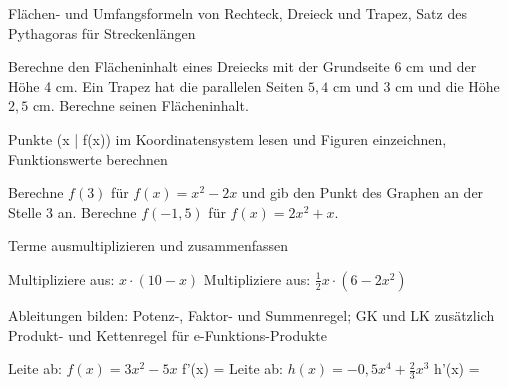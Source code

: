 \setcounter{aufgabe}{0}

\begin{aufgabe}{Flächen- und Umfangsformeln von Rechteck, Dreieck und Trapez, Satz des Pythagoras für Streckenlängen}
\begin{teile}
\teil Berechne den Flächeninhalt eines Dreiecks mit der Grundseite 6 cm und der Höhe 4 cm. \leerfeld[cm²]
\teil Ein Trapez hat die parallelen Seiten $5{,}4$ cm und 3 cm und die Höhe $2{,}5$ cm. Berechne seinen Flächeninhalt. \leerfeld[cm²]
\end{teile}
\end{aufgabe}

\begin{aufgabe}{Punkte (x | f(x)) im Koordinatensystem lesen und Figuren einzeichnen, Funktionswerte berechnen}
\begin{teile}
\teil Berechne $f(3)$ für $f(x) = x^2 - 2x$ und gib den Punkt des Graphen an der Stelle 3 an.
\teil Berechne $f(-1{,}5)$ für $f(x) = 2x^2 + x$.
\end{teile}
\end{aufgabe}

\begin{aufgabe}{Terme ausmultiplizieren und zusammenfassen}
\begin{teile}
\teil Multipliziere aus: $x \cdot (10 - x)$
\teil Multipliziere aus: $\tfrac{1}{2}x \cdot (6 - 2x^2)$
\end{teile}
\end{aufgabe}

\begin{aufgabe}{Ableitungen bilden: Potenz-, Faktor- und Summenregel; GK und LK zusätzlich Produkt- und Kettenregel für e-Funktions-Produkte}
\begin{teile}
\teil Leite ab: $f(x) = 3x^2 - 5x$ f'(x) = \leerfeld
\teil Leite ab: $h(x) = -0{,}5x^4 + \tfrac{2}{3}x^3$ h'(x) = \leerfeld
\end{teile}
\end{aufgabe}


